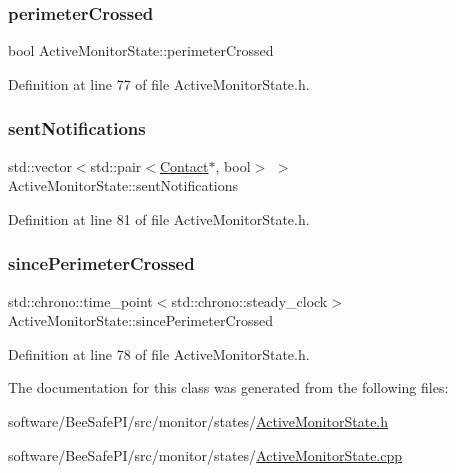 \subsubsection{\texorpdfstring{perimeter\+Crossed}{perimeterCrossed}}
{\footnotesize\ttfamily bool Active\+Monitor\+State\+::perimeter\+Crossed\hspace{0.3cm}{\ttfamily [private]}}



Definition at line 77 of file Active\+Monitor\+State.\+h.

\mbox{\label{class_active_monitor_state_a25493a87079926faf7d03b8587ad9f62}} 
\subsubsection{\texorpdfstring{sent\+Notifications}{sentNotifications}}
{\footnotesize\ttfamily std\+::vector$<$std\+::pair$<$\hyperlink{class_contact}{Contact}$\ast$, bool$>$ $>$ Active\+Monitor\+State\+::sent\+Notifications\hspace{0.3cm}{\ttfamily [private]}}



Definition at line 81 of file Active\+Monitor\+State.\+h.

\mbox{\label{class_active_monitor_state_a4313399b0922fccd66ecea2fcf77c08f}} 
\subsubsection{\texorpdfstring{since\+Perimeter\+Crossed}{sincePerimeterCrossed}}
{\footnotesize\ttfamily std\+::chrono\+::time\+\_\+point$<$std\+::chrono\+::steady\+\_\+clock$>$ Active\+Monitor\+State\+::since\+Perimeter\+Crossed\hspace{0.3cm}{\ttfamily [private]}}



Definition at line 78 of file Active\+Monitor\+State.\+h.



The documentation for this class was generated from the following files\+:\begin{DoxyCompactItemize}
\item 
software/\+Bee\+Safe\+P\+I/src/monitor/states/\hyperlink{_active_monitor_state_8h}{Active\+Monitor\+State.\+h}\item 
software/\+Bee\+Safe\+P\+I/src/monitor/states/\hyperlink{_active_monitor_state_8cpp}{Active\+Monitor\+State.\+cpp}\end{DoxyCompactItemize}
